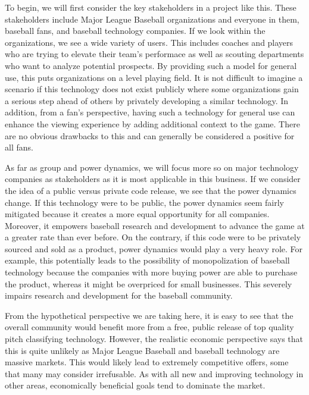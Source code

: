 \documentclass{article}
\begin{document}
To begin, we will first consider the key stakeholders in a project like this. These stakeholders include 
Major League Baseball organizations and everyone in them, baseball fans, and baseball technology companies. 
If we look within the organizations, we see a wide variety of users. This includes coaches and players who are 
trying to elevate their team's performace as well as scouting departments who want to analyze potential 
prospects. By providing such a model for general use, this puts organizations on a level playing field. It 
is not difficult to imagine a scenario if this technology does not exist publicly where some organizations gain a 
serious step ahead of others by privately developing a similar technology. In addition, from a fan's 
perspective, having such a technology for general use can enhance the viewing experience by adding 
additional context to the game. There are no obvious drawbacks to this and can generally be considered a 
positive for all fans. 

As far as group and power dynamics, we will focus more so on major technology companies as stakeholders 
as it is most applicable in this business. If we consider the idea of a public versus private code release,
we see that the power dynamics change. If this technology were to be public, the power dynamics seem fairly 
mitigated because it creates a more equal opportunity for all companies. Moreover, it empowers baseball research 
and development to advance the game at a greater rate than ever before. On the contrary, if this code 
were to be privately sourced and sold as a product, power dynamics would play a very heavy role. For example, 
this potentially leads to the possibility of monopolization of baseball technology because the companies 
with more buying power are able to purchase the product, whereas it might be overpriced for small businesses. 
This severely impairs research and development for the baseball community.

From the hypothetical perspective we are taking here, it is easy to see that the overall community 
would benefit more from a free, public release of top quality pitch classifying technology. However, 
the realistic economic perspective says that this is quite unlikely as Major League Baseball and baseball 
technology are massive markets. This would likely lead to extremely competitive offers, some that many 
may consider irrefusable. As with all new and improving technology in other areas, economically beneficial 
goals tend to dominate the market.
\end{document}
